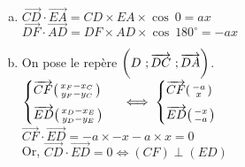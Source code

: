 \documentclass[12pt, a4paper]{article}
\begin{document}
\begin{Exercise}[number={81}]
    \begin{enumerate}[a)]
        \item $\overrightarrow{CD}\cdot\overrightarrow{EA}=CD\times EA\times\cos{\ 0}=ax$ \\ $\overrightarrow{DF}\cdot\overrightarrow{AD}=DF\times AD\times\cos{\ 180^{\circ}}=-ax$
        \item On pose le repère $\delimiterfactor=1200\left(D\ ;\overrightarrow{DC}\ ;\overrightarrow{DA}\right)$.\medskip \\ 
                    $\begin{cases}\overrightarrow{CF}\begin{psmallmatrix}x_F-x_C\\y_F-y_C\end{psmallmatrix}\\[0.2cm]\overrightarrow{ED}\begin{psmallmatrix}x_D-x_E\\y_D-y_E\end{psmallmatrix}\end{cases}$ 
                    $\iff \begin{cases}\overrightarrow{CF}\begin{psmallmatrix}-a\\x\end{psmallmatrix}\\[0.2cm]\overrightarrow{ED}\begin{psmallmatrix}-x\\-a\end{psmallmatrix}\end{cases}$ \medskip \\
                    $\overrightarrow{CF}\cdot\overrightarrow{ED}=-a\times-x-a\times x=0$ \smallskip \\
                    Or, \quad $\overrightarrow{CD}\cdot\overrightarrow{ED}=0\iff(CF)\perp(ED)$
    \end{enumerate}
\end{Exercise}
\end{document}
